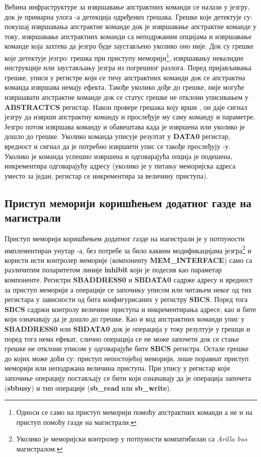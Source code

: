 Већина инфраструктуре за извршавање апстрактних команди се налази у језгру, док је примарна улога -а детекција одређених грешака. Грешке које  детектује су: покушај извршавања апстрактне команде док је извршавање апстрактне команде у току, извршавање апстрактних команди са неподржаним опцијама и извршавање команде која захтева да језгро буде заустављено уколико оно није. Док су грешке које детектује језгро: грешка при приступу меморији\footnote{Односи се само на приступ меморији помоћу апстрактних команди а не и на приступ помоћу газде на магистрали.}, извршавању невалидне инструкције или заустављању језгра из погрешног разлога. Поред пријављивања грешке, уписи у регистре који се тичу апстрактних команди док се апстрактна команда извршава немају ефекта. Такође уколико дође до грешке, није могуће извршавати апстрактне команде док се статус грешке не отклони уписивањем у  \textbf{\acrshort{ABSTRACTCS}} регистар. Након провере грешака коју врши , он даје сигнал језгру да изврши апстрактну команду и прослеђује му саму команду и параметре. Језгро потом извршава команду и обавештава  када је извршена или уколико је дошло до грешке. Уколико команда уписује резултат у \textbf{DATA0} регистар, вредност и сигнал да је потребно извршити упис се такође прослеђују -у. Уколико је команда успешно извршена и одговарајућа опција је подешена,  инкрементира одговарајућу адресу (уколико је у питању меморијска адреса уместо за један, регистар се инкрементира за величину приступа).

\subsection{Приступ меморији коришћењем додатног газде на магистрали}

Приступ меморији коришћењем додатног газде на магистрали је у потпуности имплементиран унутар -а, без потребе за било каквим модификацијама језгра\footnote{Уколико је меморијски контролер у потпуности компатибилан са \textit{Arilla bus} магистралом.} и користи исти контролер меморије (компоненту \textbf{MEM\_INTERFACE}) само са различитим поларитетом линије \textbf{inhibit} који је подесив као параметар компоненте. Регистри \textbf{\acrshort{SBADDRESS}0} и \textbf{\acrshort{SBDATA}0} садрже адресу и вредност за приступ меморији а операције се започињу уписом или читањем неког од тих регистара у зависности од бита конфигурисаних у регистру \textbf{\acrshort{SBCS}}. Поред тога \textbf{\acrshort{SBCS}} садржи контролу величине приступа и инкрементирања адресе, као и бите који означавају да је дошло до грешке. Као и код апстрактних команди упис у \textbf{\acrshort{SBADDRESS}0} или \textbf{\acrshort{SBDATA}0} док је операција у току резултује у грешци и поред тога нема ефекат, слично операција се не може започети док се стање грешке не отклони уписом у одговарајуће бите \textbf{\acrshort{SBCS}} регистра. Остале грешке до којих може доћи су: приступ непостојећој меморији, лоше поравнат приступ меморији или неподржана величина приступа. При упису у регистар који започиње операцију постављају се бити који означавају да је операција започета (\textbf{sbbusy}) и тип операције (\textbf{sb\_read} или \textbf{sb\_write}).

